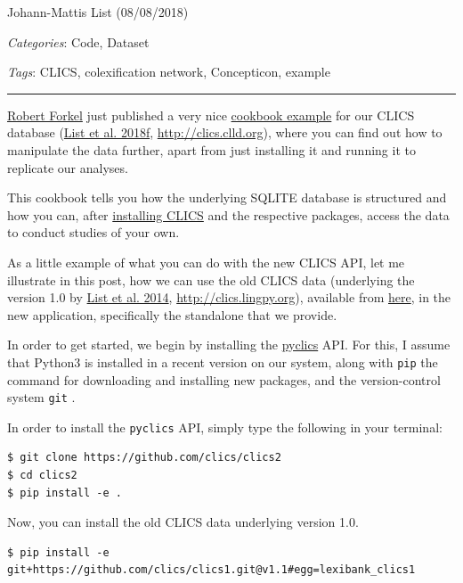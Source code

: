 \documentclass[
  a4paper,
  14pt,
  oneside,
  tablecaptionabove
]{scrbook}
\begin{document}
Johann-Mattis List (08/08/2018)

\emph{Categories}: Code, Dataset

\emph{Tags}: CLICS, colexification network, Concepticon, example

\begin{center}\rule{0.5\linewidth}{1pt}\end{center}

\href{https://github.com/xrotwang/}{Robert Forkel} just published a very
nice
\href{https://github.com/clics/clics2/tree/master/cookbook}{cookbook
example} for our CLICS database (\href{http://bibliography.lingpy.org?key=List2018f}{List et al. 2018f},
\url{http://clics.clld.org}), where you can find out how to manipulate
the data further, apart from just installing it and running it to
replicate our analyses.

This cookbook tells you how the underlying SQLITE database is structured
and how you can, after \href{https://github.com/clics/clics2}{installing
CLICS} and the respective packages, access the data to conduct studies
of your own.

As a little example of what you can do with the new CLICS API, let me
illustrate in this post, how we can use the old CLICS data (underlying
the version 1.0 by
\href{http://bibliography.lingpy.org?key=List2014f}{List et al. 2014},
\url{http://clics.lingpy.org}), available from
\href{https://github.com/clics/clics1}{here}, in the new application,
specifically the standalone that we provide.


In order to get started, we begin by installing the
\href{https://github.com/clics/clics2}{pyclics} API. For this, I assume
that Python3 is installed in a recent version on our system, along with
\lstinline!pip! the command for downloading and installing new packages,
and the version-control system \lstinline!git! .

In order to install the \lstinline!pyclics! API, simply type the
following in your terminal:

\begin{lstlisting}
$ git clone https://github.com/clics/clics2
$ cd clics2
$ pip install -e .
\end{lstlisting}

Now, you can install the old CLICS data underlying version 1.0.

\begin{lstlisting}
$ pip install -e git+https://github.com/clics/clics1.git@v1.1#egg=lexibank_clics1
\end{lstlisting}
\end{document}
